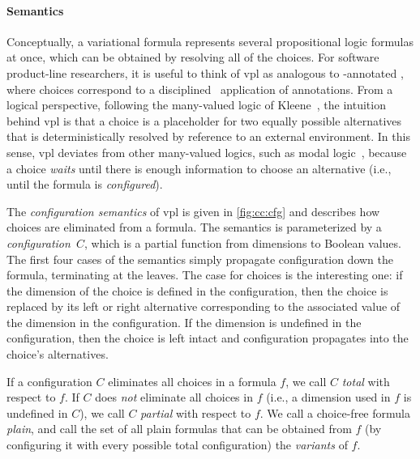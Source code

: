 \paragraph{Semantics}
%
Conceptually, a variational formula represents several propositional logic
formulas at once, which can be obtained by resolving all of the choices. For
software product-line researchers, it is useful to think of \ac{vpl} as analogous
to -annotated \pl{}, where choices correspond to a
disciplined~\cite{LKA:AOSD11} application of  annotations.
%
From a logical perspective, following the many-valued logic of
Kleene~\cite{kleene1968introduction,Rescher1969-RESML}, the intuition behind
\ac{vpl} is that a choice is a placeholder for two equally possible alternatives
that is deterministically resolved by reference to an external environment.
%
In this sense, \ac{vpl} deviates from other many-valued logics, such as modal
logic~\cite{sep-logic-modal}, because a choice \emph{waits} until there is
enough information to choose an alternative (i.e., until the formula is
\emph{configured}).


The \emph{configuration semantics} of \ac{vpl} is given in
\autoref{fig:cc:cfg} and describes how choices are eliminated from a
formula. The semantics is parameterized by a \emph{configuration}\ $C$, which is
a partial function from dimensions to Boolean values.
%
The first four cases of the semantics simply propagate configuration down the
formula, terminating at the leaves. The case for choices is the interesting one:
if the dimension of the choice is defined in the configuration, then the choice
is replaced by its left or right alternative corresponding to the associated
value of the dimension in the configuration. If the dimension is undefined in
the configuration, then the choice is left intact and configuration propagates
into the choice's alternatives.


If a configuration $C$ eliminates all choices in a formula $f$, we call $C$
\emph{total} with respect to $f$. If $C$ does \emph{not} eliminate all choices
in $f$ (i.e., a dimension used in $f$ is undefined in $C$), we call $C$
\emph{partial} with respect to $f$.
%
We call a choice-free formula \emph{plain}, and call the set of all plain
formulas that can be obtained from $f$ (by configuring it with every possible
total configuration) the \emph{variants} of $f$.


